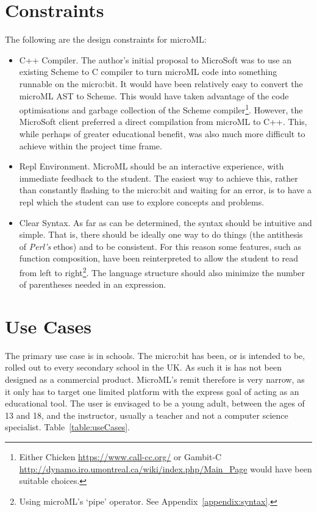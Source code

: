 \documentclass[12pt, a4paper]{report}
\begin{document}
\section{Constraints}
\label{constraints}
The following are the design constraints for microML\@:
\begin{itemize}
    \item C++ Compiler. The author's initial proposal to MicroSoft was to use an existing Scheme
        to C compiler to turn microML code into something runnable on the micro:bit. It would have
        been relatively easy to convert the microML AST to Scheme. This would have taken advantage of
        the code optimisations and garbage collection of the Scheme compiler\footnote{Either Chicken
        \url{https://www.call-cc.org/} or Gambit-C \url{http://dynamo.iro.umontreal.ca/wiki/index.php/Main_Page}
        would have been suitable choices.}. However, the MicroSoft client preferred a direct
        compilation from microML to C++. This, while perhaps of greater educational benefit, was also
        much more difficult to achieve within the project time frame.
    \item Repl Environment. MicroML should be an interactive experience, with immediate feedback to
        the student. The easiest way to achieve this, rather than constantly flashing to the
        micro:bit and waiting for an error, is to have a repl which the student can use to explore
        concepts and problems. 
    \item Clear Syntax. As far as can be determined, the syntax should be intuitive and simple. That
        is, there should be ideally one way to do things (the antithesis of \textit{Perl's} ethos)
        and to be consistent. For this reason some features, such as function composition, have been
        reinterpreted to allow the student to read from left to right\footnote{Using microML's
        `pipe' operator. See Appendix~\ref{appendix:syntax}.}. The language structure should also
        minimize the number of parentheses needed in an expression.
\end{itemize}

\section{Use Cases}
The primary use case is in schools. The micro:bit has been, or is intended to be, rolled out to
every secondary school in the UK\@. As such it is has not been designed as a commercial product.
MicroML's remit therefore is very narrow, as it only has to target one limited platform with the
express goal of acting as an educational tool. The user is envisaged to be a young adult, between
the ages of 13 and 18, and the instructor, usually a teacher and not a computer science specialist.
Table~\ref{table:useCases}.
\end{document}
